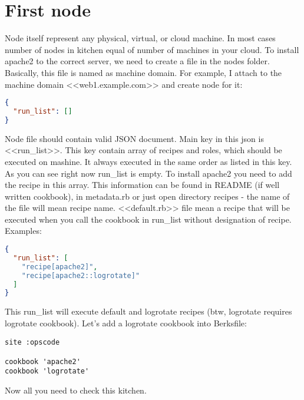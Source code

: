 \section{First node}

Node itself represent any physical, virtual, or cloud machine. In most cases number of nodes in kitchen equal of number of machines in your cloud. To install apache2 to the correct server, we need to create a file in the nodes folder. Basically, this file is named as machine domain. For example, I attach to the machine domain <<web1.example.com>> and create node for it:

\begin{lstlisting}[language=JSON,label=lst:my-cloud-node1,title=my-cloud/nodes/web1.example.com.json]
{
  "run_list": []
}
\end{lstlisting}

Node file should contain valid JSON document. Main key in this json is <<run\_list>>. This key contain array of recipes and roles, which should be executed on mashine. It always executed in the same order as listed in this key. As you can see right now run\_list is empty. To install apache2 you need to add the recipe in this array. This information can be found in README (if well written cookbook), in metadata.rb or just open directory recipes - the name of the file will mean recipe name. <<default.rb>> file mean a recipe that will be executed when you call the cookbook in run\_list without designation of recipe. Examples:

\begin{lstlisting}[language=JSON,label=lst:my-cloud-node2,title=my-cloud/nodes/web1.example.com.json]
{
  "run_list": [
    "recipe[apache2]",
    "recipe[apache2::logrotate]"
  ]
}
\end{lstlisting}

This run\_list will execute default and logrotate recipes (btw, logrotate requires logrotate cookbook). Let's add a logrotate cookbook into Berksfile:

\begin{lstlisting}[label=lst:my-cloud-node3,title=my-cloud/Berksfile]
site :opscode

cookbook 'apache2'
cookbook 'logrotate'
\end{lstlisting}

Now all you need to check this kitchen.